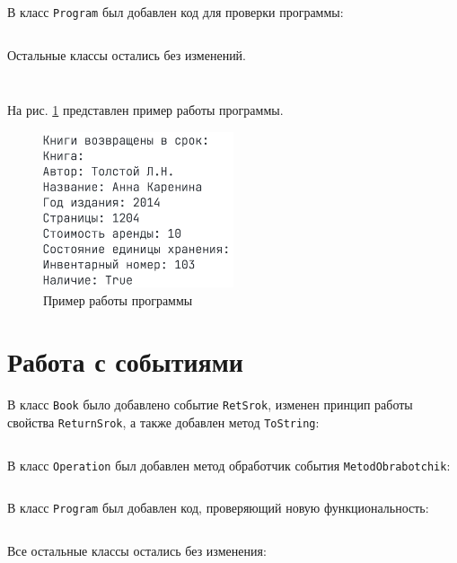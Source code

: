 \documentclass[a4paper,14pt]{extarticle}
\numberwithin{figure}{section}
\begin{document}
В класс \texttt{Program} был добавлен код для проверки программы:

\inputminted{csharp}{../MyClass/MyClass/Program.cs}

Остальные классы остались без изменений.

\inputminted{csharp}{../MyClass/MyClass/Item.cs}

\inputminted{csharp}{../MyClass/MyClass/IPubs.cs}

На рис. \ref{fig:task-1} представлен пример работы программы.

\begin{figure}[H]
    \centering
    \includegraphics[width=0.5\textwidth]{images/task-1.png}
    \caption{Пример работы программы}
    \label{fig:task-1}
\end{figure}

\section{Работа с событиями}

В класс \texttt{Book} было добавлено событие \texttt{RetSrok}, изменен принцип работы свойства \texttt{ReturnSrok}, а также добавлен метод \texttt{ToString}:

\inputminted{csharp}{../MyClass1/MyClass/Book.cs}

В класс \texttt{Operation} был добавлен метод обработчик события \texttt{MetodObrabotchik}:

\inputminted{csharp}{../MyClass1/MyClass/Operation.cs}

В класс \texttt{Program} был добавлен код, проверяющий новую функциональность:

\inputminted{csharp}{../MyClass1/MyClass/Program.cs}

Все остальные классы остались без изменения:

\inputminted{csharp}{../MyClass1/MyClass/Item.cs}

\inputminted{csharp}{../MyClass1/MyClass/IPubs.cs}
\end{document}
